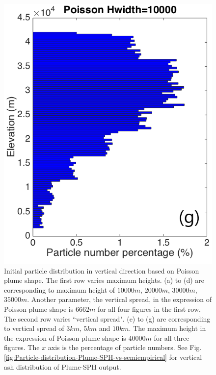 \documentclass[utf8]{frontiersSCNS} %
\begin{document}
\begin{figure}[!htb]
\begin{minipage}{.247 \textwidth}
\end{minipage}%
\begin{minipage}{.247 \textwidth}
\centering
\includegraphics[width=0.99 \textwidth]{Figures/Possion-Hwidth10k-ParticleDis-z}
\end{minipage}%
\caption{Initial particle distribution in vertical direction based on Poisson plume shape. The first row varies maximum heights. (a) to (d) are corresponding to maximum height of $10000 m$, $20000 m$, $30000 m$, $35000 m$. Another parameter, the vertical spread, in the expression of Poisson plume shape is $6662 m$ for all four figures in the first row. The second row varies ``vertical spread". (e) to (g) are corresponding to vertical spread of $3km$, $5km$ and $10 km$. The maximum height in the expression of Poisson plume shape is $40000 m$ for all three figures. The $x$ axis is the percentage of particle numbers. See Fig. \ref{fig:Particle-distribution-Plume-SPH-vs-semiempirical} for vertical ash distribution of Plume-SPH output.}
\label{fig:Particle-distribution-Plume-calibrate-semiempirical}
\end{figure}
\end{document}
